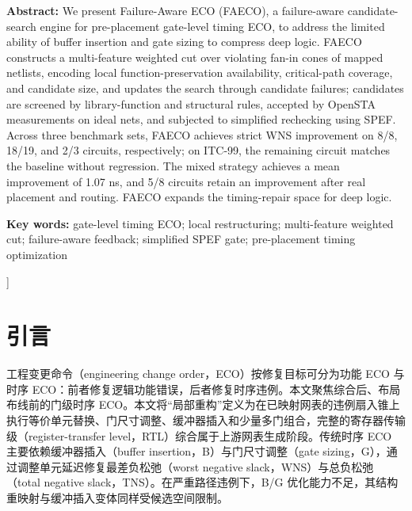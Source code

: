\documentclass[twocolumn,10pt,fontset=windows]{ctexart}
\begin{document}
\begin{flushleft}
  {\bfseries Abstract:} {\small We present Failure-Aware ECO (FAECO), a failure-aware candidate-search engine for pre-placement gate-level timing ECO, to address the limited ability of buffer insertion and gate sizing to compress deep logic. FAECO constructs a multi-feature weighted cut over violating fan-in cones of mapped netlists, encoding local function-preservation availability, critical-path coverage, and candidate size, and updates the search through candidate failures; candidates are screened by library-function and structural rules, accepted by OpenSTA measurements on ideal nets, and subjected to simplified rechecking using SPEF. Across three benchmark sets, FAECO achieves strict WNS improvement on 8/8, 18/19, and 2/3 circuits, respectively; on ITC-99, the remaining circuit matches the baseline without regression. The mixed strategy achieves a mean improvement of 1.07 ns, and 5/8 circuits retain an improvement after real placement and routing. FAECO expands the timing-repair space for deep logic.}\par
\vspace{3pt}
{\bfseries Key words:} {\small gate-level timing ECO; local restructuring; multi-feature weighted cut; failure-aware feedback; simplified SPEF gate; pre-placement timing optimization}\par
\end{flushleft}
]%


\section{引言}

工程变更命令（engineering change order，ECO）按修复目标可分为功能 ECO 与时序 ECO：前者修复逻辑功能错误，后者修复时序违例。本文聚焦综合后、布局布线前的门级时序 ECO。本文将“局部重构”定义为在已映射网表的违例扇入锥上执行等价单元替换、门尺寸调整、缓冲器插入和少量多门组合，完整的寄存器传输级（register-transfer level，RTL）综合属于上游网表生成阶段。传统时序 ECO 主要依赖缓冲器插入（buffer insertion，B）与门尺寸调整（gate sizing，G），通过调整单元延迟修复最差负松弛（worst negative slack，WNS）与总负松弛（total negative slack，TNS）。在严重路径违例下，B/G 优化能力不足，其结构重映射与缓冲插入变体同样受候选空间限制\cite{chen2012metal,chen2012fixability,liang2012buffer,ho2010eco}。
\end{document}
